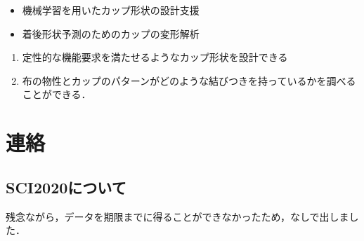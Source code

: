 \documentclass[11pt]{jsarticle}
\begin{document}
	\articleSPRabst
		\begin{itemize}
			\item 機械学習を用いたカップ形状の設計支援
			\item 着後形状予測のためのカップの変形解析
		\end{itemize}
		
		
	\articleSPRobj
		\begin{enumerate}
			\item 定性的な機能要求を満たせるようなカップ形状を設計できる
			\item 布の物性とカップのパターンがどのような結びつきを持っているかを調べることができる．
		\end{enumerate}
	\articleSPRitemsone
		
		\tableofcontents
		
		
	\articleSPRitemstwo
	\renewcommand{\labelitemi}{$\blacktriangledown$}
	\newcommand{\argmax}{\mathop{\rm arg~max}\limits}
	\newcommand{\argmin}{\mathop{\rm arg~min}\limits}
	\newcommand{\Ker}{{\rm Ker}}
	\newcommand{\rank}{{\rm rank}}
	\section{連絡}
		\subsection{SCI2020について}
			残念ながら，データを期限までに得ることができなかったため，なしで出しました．
\end{document}

